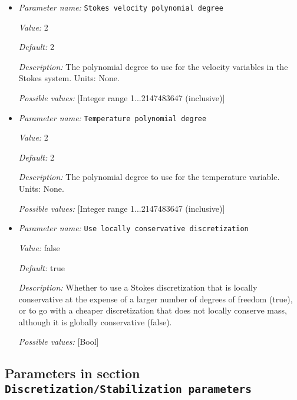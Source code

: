 \begin{itemize}
\item {\it Parameter name:} {\tt Stokes velocity polynomial degree}


{\it Value:} 2


{\it Default:} 2


{\it Description:} The polynomial degree to use for the velocity variables in the Stokes system. Units: None.


{\it Possible values:} [Integer range 1...2147483647 (inclusive)]
\item {\it Parameter name:} {\tt Temperature polynomial degree}


{\it Value:} 2


{\it Default:} 2


{\it Description:} The polynomial degree to use for the temperature variable. Units: None.


{\it Possible values:} [Integer range 1...2147483647 (inclusive)]
\item {\it Parameter name:} {\tt Use locally conservative discretization}


{\it Value:} false


{\it Default:} true


{\it Description:} Whether to use a Stokes discretization that is locally conservative at the expense of a larger number of degrees of freedom (true), or to go with a cheaper discretization that does not locally conserve mass, although it is globally conservative (false).


{\it Possible values:} [Bool]
\end{itemize}



\subsection{Parameters in section \tt Discretization/Stabilization parameters}

